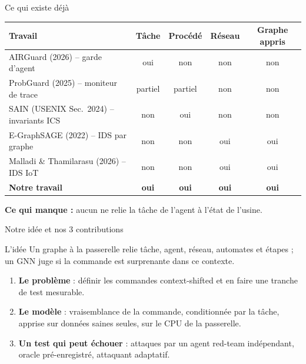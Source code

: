 \documentclass[aspectratio=169,11pt]{beamer}
\begin{document}
\begin{frame}{Ce qui existe déjà}
\centering\small
\begin{tabular}{lcccc}
\toprule
Travail & Tâche & Procédé & Réseau & Graphe appris \\
\midrule
AIRGuard (2026) -- garde d'agent & oui & non & non & non \\
ProbGuard (2025) -- moniteur de trace & partiel & partiel & non & non \\
SAIN (USENIX Sec.\ 2024) -- invariants ICS & non & oui & non & non \\
E-GraphSAGE (2022) -- IDS par graphe & non & non & oui & oui \\
Malladi \& Thamilarasu (2026) -- IDS IoT & non & non & oui & oui \\
\midrule
\textbf{Notre travail} & \textbf{oui} & \textbf{oui} & \textbf{oui} & \textbf{oui} \\
\bottomrule
\end{tabular}
\vspace{3mm}

\raggedright
\textbf{Ce qui manque :} aucun ne relie la tâche de l'agent à l'état de l'usine.
\end{frame}

\begin{frame}{Notre idée et nos 3 contributions}
\begin{exampleblock}{L'idée}
Un graphe à la passerelle relie tâche, agent, réseau, automates et étapes ; un GNN juge si la commande est \og surprenante\fg{} dans ce contexte.
\end{exampleblock}
\begin{enumerate}
\item \textbf{Le problème} : définir les commandes context-shifted et en faire une tranche de test mesurable.
\item \textbf{Le modèle} : vraisemblance de la commande, conditionnée par la tâche, apprise sur données saines seules, sur le CPU de la passerelle.
\item \textbf{Un test qui peut échouer} : attaques par un agent red-team indépendant, oracle pré-enregistré, attaquant adaptatif.
\end{enumerate}
\end{frame}
\end{document}
